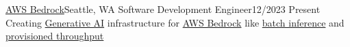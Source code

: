 \resumeSubheading
{\href{https://aws.amazon.com/bedrock/}{AWS Bedrock}}{Seattle, WA}
{Software Development Engineer}{12/2023 \textemdash Present}
\resumeItemListStart
{}
{Creating \href{https://en.wikipedia.org/wiki/Generative_artificial_intelligence}{Generative AI} infrastructure for \href{https://aws.amazon.com/bedrock/}{AWS Bedrock} like \href{https://docs.aws.amazon.com/bedrock/latest/userguide/batch-inference.html}{batch inference} and \href{https://docs.aws.amazon.com/bedrock/latest/userguide/prov-throughput.html}{provisioned throughput}}
\resumeItemListEnd
